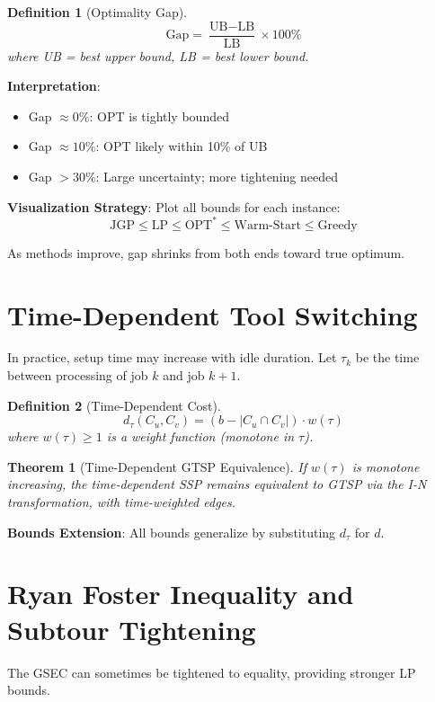 \documentclass[12pt]{article}
\newtheorem{theorem}{Theorem}[section]
\newtheorem{definition}{Definition}[section]
\begin{document}
	\begin{definition}[Optimality Gap]
		$$\text{Gap} = \frac{\text{UB} - \text{LB}}{\text{LB}} \times 100\%$$
		where UB = best upper bound, LB = best lower bound.
	\end{definition}
	
	\textbf{Interpretation}:
	\begin{itemize}
		\item Gap $\approx 0\%$: OPT is tightly bounded
		\item Gap $\approx 10\%$: OPT likely within 10\% of UB
		\item Gap $> 30\%$: Large uncertainty; more tightening needed
	\end{itemize}
	
	\textbf{Visualization Strategy}: Plot all bounds for each instance:
	$$\text{JGP} \le \text{LP} \le \text{OPT}^* \le \text{Warm-Start} \le \text{Greedy}$$
	
	As methods improve, gap shrinks from both ends toward true optimum.
	
	\section{Time-Dependent Tool Switching}
	
	In practice, setup time may increase with idle duration. Let $\tau_k$ be the time between processing of job $k$ and job $k+1$.
	
	\begin{definition}[Time-Dependent Cost]
		$$d_{\tau}(C_u, C_v) = (b - |C_u \cap C_v|) \cdot w(\tau)$$
		where $w(\tau) \ge 1$ is a weight function (monotone in $\tau$).
	\end{definition}
	
	\begin{theorem}[Time-Dependent GTSP Equivalence]
		If $w(\tau)$ is monotone increasing, the time-dependent SSP remains equivalent to GTSP via the I-N transformation, with time-weighted edges.
	\end{theorem}
	
	\textbf{Bounds Extension}: All bounds generalize by substituting $d_\tau$ for $d$.
	
	\section{Ryan Foster Inequality and Subtour Tightening}
	
	The GSEC can sometimes be tightened to equality, providing stronger LP bounds.
	
\end{document}
